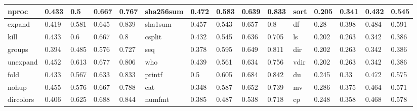 \begin{table*}[h!]
\begin{center}
\begin{tabular}{ | l | l | l | l | l | l | l | l | l | l | l | l | l | l | l | }
	nproc & 0.433 & 0.5 & 0.667 & 0.767 & sha256sum & 0.472 & 0.583 & 0.639 & 0.833 & sort & 0.205 & 0.341 & 0.432 & 0.545 \\ \hline
	expand & 0.419 & 0.581 & 0.645 & 0.839 & sha1sum & 0.457 & 0.543 & 0.657 & 0.8 & df & 0.28 & 0.398 & 0.484 & 0.591 \\ \hline
	kill & 0.433 & 0.6 & 0.667 & 0.8 & csplit & 0.432 & 0.545 & 0.636 & 0.705 & ls & 0.202 & 0.263 & 0.342 & 0.386 \\ \hline
	groups & 0.394 & 0.485 & 0.576 & 0.727 & seq & 0.378 & 0.595 & 0.649 & 0.811 & dir & 0.202 & 0.263 & 0.342 & 0.386 \\ \hline
	unexpand & 0.452 & 0.613 & 0.677 & 0.806 & who & 0.439 & 0.561 & 0.634 & 0.756 & vdir & 0.202 & 0.263 & 0.342 & 0.386 \\ \hline
	fold & 0.433 & 0.567 & 0.633 & 0.833 & printf & 0.5 & 0.605 & 0.684 & 0.842 & du & 0.245 & 0.33 & 0.472 & 0.575 \\ \hline
	nohup & 0.455 & 0.576 & 0.667 & 0.788 & cat & 0.348 & 0.587 & 0.652 & 0.739 & mv & 0.286 & 0.375 & 0.464 & 0.571 \\ \hline
	dircolors & 0.406 & 0.625 & 0.688 & 0.844 & numfmt & 0.385 & 0.487 & 0.538 & 0.718 & cp & 0.248 & 0.358 & 0.468 & 0.578 \\ \hline
\end{tabular}
\end{center}
\end{table*}

